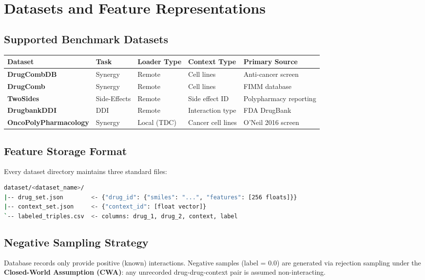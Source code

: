 \documentclass[12pt,a4paper,oneside]{article}
\begin{document}
\section{Datasets and Feature Representations}\label{sec:datasets}

\subsection{Supported Benchmark Datasets}

\begin{longtable}{>{\bfseries}p{3.5cm}p{2.5cm}p{2.5cm}p{2.5cm}p{3cm}}
\toprule
\textbf{Dataset} & \textbf{Task} & \textbf{Loader Type} & \textbf{Context Type} & \textbf{Primary Source} \\
\midrule\endhead
DrugCombDB & Synergy & Remote & Cell lines & Anti-cancer screen \\
DrugComb & Synergy & Remote & Cell lines & FIMM database \\
TwoSides & Side-Effects & Remote & Side effect ID & Polypharmacy reporting \\
DrugbankDDI & DDI & Remote & Interaction type & FDA DrugBank \\
OncoPolyPharmacology & Synergy & Local (TDC) & Cancer cell lines & O'Neil 2016 screen \\
\bottomrule
\end{longtable}

\subsection{Feature Storage Format}
Every dataset directory maintains three standard files:
\begin{lstlisting}[language=bash]
dataset/<dataset_name>/
|-- drug_set.json        <- {"drug_id": {"smiles": "...", "features": [256 floats]}}
|-- context_set.json     <- {"context_id": [float vector]}
`-- labeled_triples.csv  <- columns: drug_1, drug_2, context, label
\end{lstlisting}

\subsection{Negative Sampling Strategy}
Database records only provide positive (known) interactions. Negative samples (label = 0.0) are generated via rejection sampling under the \textbf{Closed-World Assumption (CWA)}: any unrecorded drug-drug-context pair is assumed non-interacting.
\end{document}
